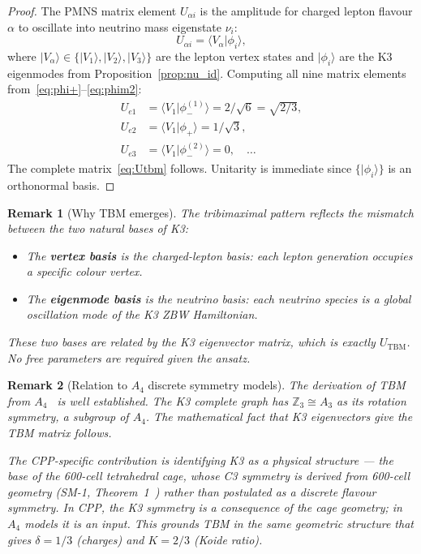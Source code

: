 \documentclass[11pt]{article}
\newtheorem{remark}{Remark}[section]
\newcommand{\TBM}{\mathrm{TBM}}
\begin{document}
\begin{proof}
The PMNS matrix element $U_{\alpha i}$ is the amplitude for charged
lepton flavour $\alpha$ to oscillate into neutrino mass eigenstate
$\nu_i$:
\begin{equation}
U_{\alpha i} = \langle V_\alpha | \phi_i \rangle,
\end{equation}
where $|V_\alpha\rangle \in \{|V_1\rangle, |V_2\rangle, |V_3\rangle\}$
are the lepton vertex states and $|\phi_i\rangle$ are the K3 eigenmodes
from Proposition~\ref{prop:nu_id}.  Computing all nine matrix elements
from~\eqref{eq:phi+}--\eqref{eq:phim2}:
\begin{align*}
U_{e1} &= \langle V_1|\phi_-^{(1)}\rangle = 2/\sqrt{6} = \sqrt{2/3}, \\
U_{e2} &= \langle V_1|\phi_+\rangle = 1/\sqrt{3}, \\
U_{e3} &= \langle V_1|\phi_-^{(2)}\rangle = 0, \quad \ldots
\end{align*}
The complete matrix~\eqref{eq:Utbm} follows.  Unitarity is immediate
since $\{|\phi_i\rangle\}$ is an orthonormal basis.
\end{proof}

\begin{remark}[Why TBM emerges]
The tribimaximal pattern reflects the mismatch between the two natural
bases of K3:
\begin{itemize}
\item The \textbf{vertex basis} is the charged-lepton basis: each lepton
  generation occupies a specific colour vertex.
\item The \textbf{eigenmode basis} is the neutrino basis: each neutrino
  species is a global oscillation mode of the K3 ZBW Hamiltonian.
\end{itemize}
These two bases are related by the K3 eigenvector matrix, which is
exactly $U_\TBM$.  No free parameters are required given the ansatz.
\end{remark}

\begin{remark}[Relation to $A_4$ discrete symmetry models]
The derivation of TBM from $A_4$~\cite{Ma2001,AltarelliFerruglio2010}
is well established.  The K3 complete graph has $\mathbb{Z}_3 \cong A_3$
as its rotation symmetry, a subgroup of $A_4$.  The mathematical fact
that K3 eigenvectors give the TBM matrix follows.

The CPP-specific contribution is identifying K3 as a
\emph{physical structure} --- the base of the 600-cell tetrahedral
cage, whose C3 symmetry is derived from 600-cell geometry
(SM-1, Theorem~1~\cite{abshier_sm1}) rather than postulated as a
discrete flavour symmetry.  In CPP, the K3 symmetry is a consequence
of the cage geometry; in $A_4$ models it is an input.  This grounds
TBM in the same geometric structure that gives $\delta = 1/3$ (charges)
and $K = 2/3$ (Koide ratio).
\end{remark}
\end{document}
